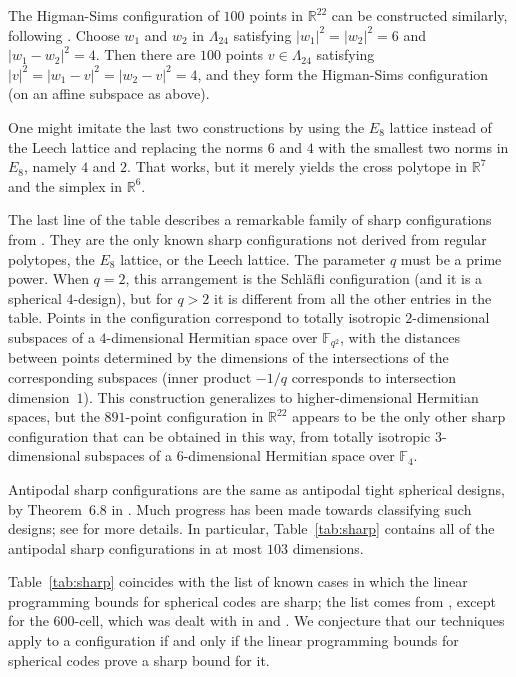\documentclass{jams-l}
\theoremstyle{plain}
\numberwithin{theorem}{section}
\theoremstyle{definition}
\numberwithin{equation}{section}
\newcommand{\R}{{\mathbb R}}
\newcommand{\F}{{\mathbb F}}
\begin{document}
The Higman-Sims configuration of $100$ points in $\R^{22}$ can be
constructed simi\-larly, following \cite{Wil}.  Choose $w_1$ and
$w_2$ in $\Lambda_{24}$ satisfying $|w_1|^2=|w_2|^2=6$ and
$|w_1-w_2|^2=4$. Then there are $100$ points $v \in \Lambda_{24}$
satisfying $|v|^2 = |w_1-v|^2 = |w_2-v|^2=4$, and they form the
Higman-Sims configuration (on an affine subspace as above).

One might imitate the last two constructions by using the $E_8$
lattice instead of the Leech lattice and replacing the norms $6$
and $4$ with the smallest two norms in $E_8$, namely $4$ and $2$.
That works, but it merely yields the cross polytope in $\R^7$ and
the simplex in $\R^6$.

The last line of the table describes a remarkable family of sharp
configurations from \cite{CGS}.  They are the only known sharp
configurations not derived from regular polytopes, the $E_8$
lattice, or the Leech lattice.  The parameter $q$ must be a prime
power. When $q=2$, this arrangement is the Schl\"afli configuration
(and it is a spherical $4$-design), but for $q>2$ it is different
from all the other entries in the table. Points in the
configuration correspond to totally isotropic $2$-dimensional
subspaces of a $4$-dimensional Hermitian space over $\F_{q^2}$,
with the distances between points determined by the dimensions of
the intersections of the corresponding subspaces (inner product
$-1/q$ corresponds to intersection dimension~$1$). This
construction generalizes to higher-dimensional Hermitian spaces,
but the $891$-point configuration in $\R^{22}$ appears to be the
only other sharp configuration that can be obtained in this way,
from totally isotropic $3$-dimensional subspaces of a
$6$-dimensional Hermitian space over $\F_4$.

Antipodal sharp configurations are the same as antipodal tight
spherical designs, by Theorem~6.8 in \cite{DGS}.  Much progress
has been made towards classifying such designs; see \cite{BMV} for
more details.  In particular, Table~\ref{tab:sharp} contains all
of the antipodal sharp configurations in at most $103$ dimensions.

Table~\ref{tab:sharp} coincides with the list of known cases in
which the linear programming bounds for spherical codes are sharp;
the list comes from \cite[p.~621]{L3}, except for the $600$-cell,
which was dealt with in \cite{A3} and \cite{E}.  We conjecture
that our techniques apply to a configuration if and only if the
linear programming bounds for spherical codes prove a sharp bound
for it.
\end{document}
